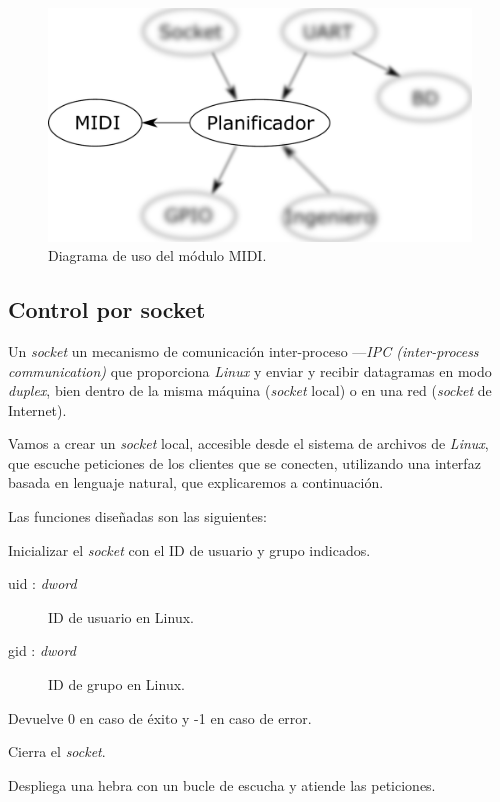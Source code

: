 \smallskip

\begin{figure}[H]
	\noindent \begin{centering}
		\includegraphics[width=\linewidth/2]{capitulo4/daemon_midi}
		\par\end{centering}
	\smallskip
	\caption{\label{fig:daemon_midi} Diagrama de uso del módulo MIDI.}
\end{figure} 

\smallskip

\subsection{Control por socket}

Un \textit{socket} un mecanismo de comunicación inter-proceso ---\textit{IPC (inter-process communication)} que proporciona \textit{Linux} y enviar y recibir datagramas en modo \textit{duplex}, bien dentro de la misma máquina (\textit{socket} local) o en una red (\textit{socket} de Internet).

Vamos a crear un \textit{socket} local, accesible desde el sistema de archivos de \textit{Linux}, que escuche peticiones de los clientes que se conecten, utilizando una interfaz basada en lenguaje natural, que explicaremos a continuación.

Las funciones diseñadas son las siguientes:

\begin{description}[style=nextline]
	\item[socket\_init (uid, gid) : \textit{dword}]
	Inicializar el \textit{socket} con el ID de usuario y grupo indicados.
	
	\begin{description}
		\item[uid : \textit{dword}] ID de usuario en Linux.
		\item[gid : \textit{dword}] ID de grupo en Linux.
	\end{description}
	
	Devuelve 0 en caso de éxito y -1 en caso de error.
	
	\item[socket\_destroy ()]
	Cierra el \textit{socket}.
	
	\item[socket\_loop ()]
	Despliega una hebra con un bucle de escucha y atiende las peticiones.
	
\end{description}

